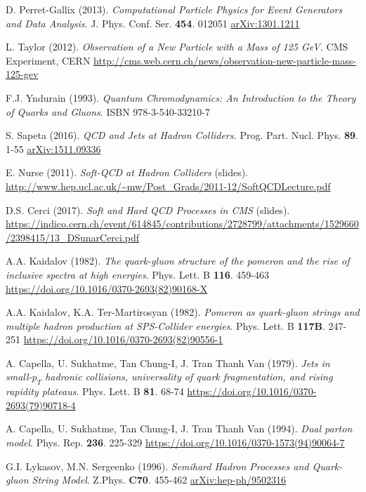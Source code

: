 \begin{thebibliography}{24}
D. Perret-Gallix (2013).
\textit{Computational Particle Physics for Event Generators and Data Analysis}.
J. Phys. Conf. Ser.
\textbf{454}.
012051
\href{https://arxiv.org/abs/1301.1211}{arXiv:1301.1211}

L. Taylor (2012).
\textit{Observation of a New Particle with a Mass of 125 GeV.}
CMS Experiment, CERN
\url{http://cms.web.cern.ch/news/observation-new-particle-mass-125-gev}

F.J. Yndurain (1993).
\textit{Quantum Chromodynamics: An Introduction to the Theory of Quarks and Gluons}.
ISBN 978-3-540-33210-7

S. Sapeta (2016).
\textit{QCD and Jets at Hadron Colliders.}
Prog. Part. Nucl. Phys.
\textbf{89}.
1-55
\href{https://arxiv.org/abs/1511.09336v2}{arXiv:1511.09336}

E. Nurse (2011).
\textit{Soft-QCD at Hadron Colliders} (slides).
\url{http://www.hep.ucl.ac.uk/~mw/Post_Grads/2011-12/SoftQCDLecture.pdf}

D.S. Cerci (2017).
\textit{Soft and Hard QCD Processes in CMS} (slides).
\url{https://indico.cern.ch/event/614845/contributions/2728799/attachments/1529660/2398415/13_DSunarCerci.pdf}

A.A. Kaidalov (1982).
\textit{The quark-gluon structure of the pomeron and the rise of inclusive spectra at high energies}.
Phys. Lett. B
\textbf{116}.
459-463
\url{https://doi.org/10.1016/0370-2693(82)90168-X}

A.A. Kaidalov, K.A. Ter-Martirosyan (1982).
\textit{Pomeron as quark-gluon strings and multiple hadron production at SPS-Collider energies}.
Phys. Lett. B
\textbf{117B}.
247-251
\url{https://doi.org/10.1016/0370-2693(82)90556-1}

A. Capella, U. Sukhatme, Tan Chung-I, J. Tran Thanh Van (1979).
\textit{Jets in small-$p_T$ hadronic collisions, universality of quark fragmentation, and rising rapidity plateaus}.
Phys. Lett. B
\textbf{81}.
68-74
\url{https://doi.org/10.1016/0370-2693(79)90718-4}

A. Capella, U. Sukhatme, Tan Chung-I, J. Tran Thanh Van (1994).
\textit{Dual parton model}.
Phys. Rep.
\textbf{236}.
225-329
\url{https://doi.org/10.1016/0370-1573(94)90064-7}

G.I. Lykasov, M.N. Sergeenko (1996).
\textit{Semihard Hadron Processes and Quark-gluon String Model}.
Z.Phys.
\textbf{C70}.
455-462
\href{https://arxiv.org/abs/hep-ph/9502316v1}{arXiv:hep-ph/9502316}


\end{thebibliography}
